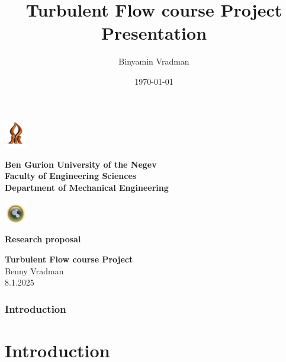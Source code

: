 \documentclass{beamer}
\title[Turbulent Flow Project]{Turbulent Flow course Project Presentation}
\author[Benny]{Binyamin Vradman}
\institute{Ben Gurion University of the Negev}
\date{\today}
\begin{document}
\begin{frame}

\thispagestyle{empty}
\setlength{\parindent}{0pt}

\noindent
\includegraphics[width=1cm]{Picture1.png}%
\hfill
\begin{minipage}[c]{0.75\textwidth}
  \centering
  {\bfseries \large Ben Gurion University of the Negev}\\
\vspace{0.3cm}  
{\bfseries Faculty of Engineering Sciences}\\
\vspace{0.3cm}
{\bfseries\large Department of Mechanical Engineering}
\end{minipage}
\hfill
\includegraphics[width=1cm]{Picture2.png}

\vspace{1cm}

\begin{center}
    { \bfseries Research proposal}\\
\end{center}

\vspace{0.3cm}

\begin{center}
    { \bfseries\large Turbulent Flow course Project}\\
\vspace{0.5cm}
{ Benny Vradman}\\
\vspace{0.2cm}
{8.1.2025}
\end{center}

\end{frame}
\begin{frame}
\frametitle{Introduction}

\end{frame}
\setcounter{page}{1}

\section{Introduction}
\end{document}
